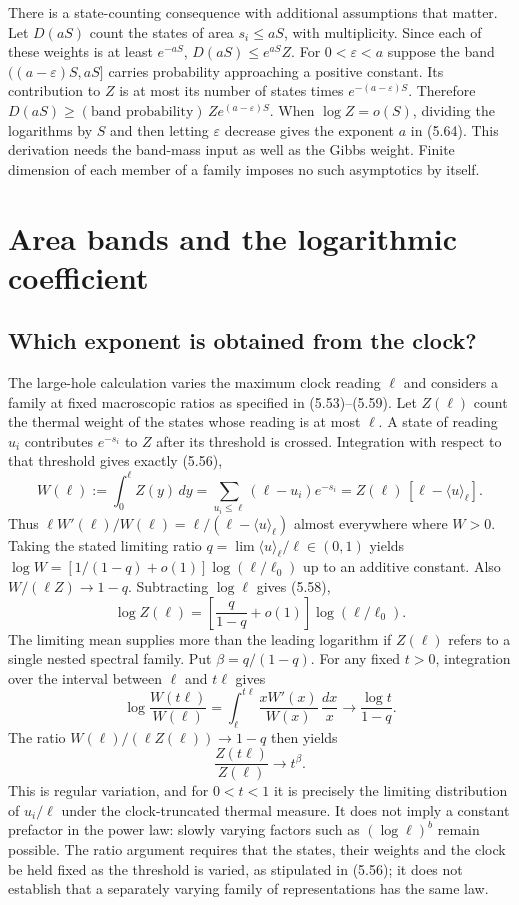 \documentclass[11pt]{article}
\newcommand{\parttitle}[2]{\section{#1}}
\begin{document}
There is a state-counting consequence with additional assumptions that matter. Let $D(aS)$ count the states of area $s_i\le aS$, with multiplicity. Since each of these weights is at least $e^{-aS}$, $D(aS)\le e^{aS}Z$. For $0<\varepsilon<a$ suppose the band $((a-\varepsilon)S,aS]$ carries probability approaching a positive constant. Its contribution to $Z$ is at most its number of states times $e^{-(a-\varepsilon)S}$. Therefore $D(aS)\ge(\text{band probability})\,Z e^{(a-\varepsilon)S}$. When $\log Z=o(S)$, dividing the logarithms by $S$ and then letting $\varepsilon$ decrease gives the exponent $a$ in (5.64). This derivation needs the band-mass input as well as the Gibbs weight. Finite dimension of each member of a family imposes no such asymptotics by itself.

\parttitle{Area bands and the logarithmic coefficient}{Area bands and the logarithmic coefficient}
\subsection{Which exponent is obtained from the clock?}
The large-hole calculation varies the maximum clock reading $\ell$ and considers a family at fixed macroscopic ratios as specified in (5.53)--(5.59). Let $Z(\ell)$ count the thermal weight of the states whose reading is at most $\ell$. A state of reading $u_i$ contributes $e^{-s_i}$ to $Z$ after its threshold is crossed. Integration with respect to that threshold gives exactly (5.56),
\[
 W(\ell):=\int_0^\ell Z(y)\,dy
     =\sum_{u_i\le\ell}(\ell-u_i)e^{-s_i}
     =Z(\ell)\,[\ell-\langle u\rangle_\ell] .
\]
Thus $\ell W'(\ell)/W(\ell)=\ell/(\ell-\langle u\rangle_\ell)$ almost everywhere where $W>0$. Taking the stated limiting ratio $q=\lim\langle u\rangle_\ell/\ell\in(0,1)$ yields $\log W=[1/(1-q)+o(1)]\log(\ell/\ell_0)$ up to an additive constant. Also $W/(\ell Z)\to1-q$. Subtracting $\log\ell$ gives (5.58),
\begin{equation}\label{eq:q}
 \log Z(\ell)=\left[\frac{q}{1-q}+o(1)\right]\log(\ell/\ell_0).
\end{equation}
The limiting mean supplies more than the leading logarithm if $Z(\ell)$ refers to a single nested spectral family. Put $\beta=q/(1-q)$. For any fixed $t>0$, integration over the interval between $\ell$ and $t\ell$ gives
\[
 \log\frac{W(t\ell)}{W(\ell)}=
 \int_\ell^{t\ell}\frac{xW'(x)}{W(x)}\,\frac{dx}{x}
 \longrightarrow \frac{\log t}{1-q}.
\]
The ratio $W(\ell)/(\ell Z(\ell))\to1-q$ then yields
\begin{equation}\label{eq:regular}
 \frac{Z(t\ell)}{Z(\ell)}\longrightarrow t^{\beta}.
\end{equation}
This is regular variation, and for $0<t<1$ it is precisely the limiting distribution of $u_i/\ell$ under the clock-truncated thermal measure. It does not imply a constant prefactor in the power law: slowly varying factors such as $(\log\ell)^b$ remain possible. The ratio argument requires that the states, their weights and the clock be held fixed as the threshold is varied, as stipulated in (5.56); it does not establish that a separately varying family of representations has the same law.
\end{document}
